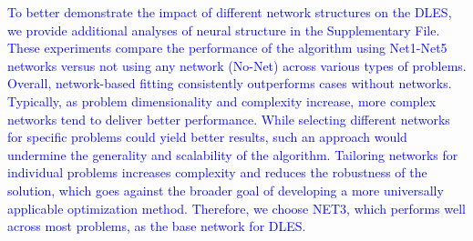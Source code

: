\documentclass[journal,twoside]{IEEEtran}
\begin{document}
\textcolor{blue}{
To better demonstrate the impact of different network structures on the DLES, we provide additional analyses of neural structure in the Supplementary File. These experiments compare the performance of the algorithm using Net1-Net5 networks versus not using any network (No-Net) across various types of problems. Overall, network-based fitting consistently outperforms cases without networks. Typically, as problem dimensionality and complexity increase, more complex networks tend to deliver better performance. While selecting different networks for specific problems could yield better results, such an approach would undermine the generality and scalability of the algorithm. Tailoring networks for individual problems increases complexity and reduces the robustness of the solution, which goes against the broader goal of developing a more universally applicable optimization method. Therefore, we choose NET3, which performs well across most problems, as the base network for DLES.
}

\begin{table}[!t]
	\centering
	\caption{Friedman ranking of DLES under different hyperparameter combinations.}
	\vspace{-2mm}
	\label{Hyperparameters}
\vspace{-4mm}
\end{table}
\end{document}
